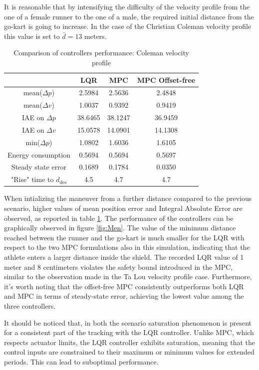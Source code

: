 \documentclass[a4paper,12pt,oneside]{book}
\begin{document}
It is reasonable that by intensifying the difficulty of the velocity profile from the one of a female runner to the one of a male, the required initial distance from the go-kart is going to increase.
In the case of the Christian Coleman velocity profile this value is set to $\bar{d} = 13$ meters.

\begin{table}[h!]
	\centering
	\begin{tabular}{c|c|c|c}
          & \textbf{LQR} & \textbf{MPC} & \textbf{MPC Offset-free} \\
	\hline
	\hline
	mean($\Delta p$) & 2.5984 & 2.5636 &  2.4848 \\
	mean($\Delta v$) & 1.0037 & 0.9392 & 0.9419 \\
	IAE on $\Delta p$ & 38.6465 & 38.1247 & 36.9459 \\
	IAE on $\Delta v$ & 15.0578 & 14.0901 & 14.1308 \\
	min($\Delta p$) & 1.0802 & 1.6036 & 1.6105 \\
	Energy consumption & 0.5694 & 0.5694 & 0.5697 \\
	Steady state error & 0.1689 & 0.1784 & 0.0350 \\
	"Rise" time to $d_\text{des}$ & 4.5 & 4.7 & 4.7 \\
	\hline
	\end{tabular}
\caption{Comparison of controllers performance: Coleman velocity profile}
\label{tab:Coleman}
\end{table}

When intializing the maneuver from a further distance compared to the previous scenario, higher values of mean position error and Integral Absolute Error are observed, as reported in table \ref{tab:Coleman}.
The performance of the controllers can be graphically observed in figure \ref{fig:Men}.
The value of the minimum distance reached between the runner and the go-kart is much smaller for the LQR with respect to the two MPC formulations also in this simulation, indicating that the athlete enters a larger distance inside the shield. 
The recorded LQR value of 1 meter and 8 centimeters violates the safety bound introduced in the MPC, similar to the observation made in the Ta Lou velocity profile case.
Furthermore, it's worth noting that the offset-free MPC consistently outperforms both LQR and MPC in terms of steady-state error, achieving the lowest value among the three controllers.

\bigskip
It should be noticed that, in both the scenario saturation phenomenon is present for a consistent part of the tracking with the LQR controller.
Unlike MPC, which respects actuator limits, the LQR controller exhibits saturation, meaning that the control inputs are constrained to their maximum or minimum values for extended periods. 
This can lead to suboptimal performance.
\end{document}
